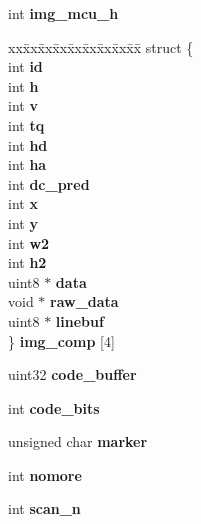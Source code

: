 \begin{DoxyCompactItemize}
\item 
\hypertarget{structjpeg_a6e013436253bcf1e5808a1774b96cc38}{}int {\bfseries img\+\_\+mcu\+\_\+h}\label{structjpeg_a6e013436253bcf1e5808a1774b96cc38}

\item 
\hypertarget{structjpeg_a1c4874d5cf0e2b80dc0d0b47ddd8be7a}{}\begin{tabbing}
xx\=xx\=xx\=xx\=xx\=xx\=xx\=xx\=xx\=\kill
struct \{\\
\>int {\bfseries id}\\
\>int {\bfseries h}\\
\>int {\bfseries v}\\
\>int {\bfseries tq}\\
\>int {\bfseries hd}\\
\>int {\bfseries ha}\\
\>int {\bfseries dc\_pred}\\
\>int {\bfseries x}\\
\>int {\bfseries y}\\
\>int {\bfseries w2}\\
\>int {\bfseries h2}\\
\>uint8 $\ast$ {\bfseries data}\\
\>void $\ast$ {\bfseries raw\_data}\\
\>uint8 $\ast$ {\bfseries linebuf}\\
\} {\bfseries img\_comp} \mbox{[}4\mbox{]}\label{structjpeg_a1c4874d5cf0e2b80dc0d0b47ddd8be7a}
\\

\end{tabbing}\item 
\hypertarget{structjpeg_abfc7f6a333ba3517e669e3e58113bbca}{}uint32 {\bfseries code\+\_\+buffer}\label{structjpeg_abfc7f6a333ba3517e669e3e58113bbca}

\item 
\hypertarget{structjpeg_a6d1b20b5d9d253006fde4e4dd8ab8c04}{}int {\bfseries code\+\_\+bits}\label{structjpeg_a6d1b20b5d9d253006fde4e4dd8ab8c04}

\item 
\hypertarget{structjpeg_a9a5cd40790fd432795fb19477c921f8c}{}unsigned char {\bfseries marker}\label{structjpeg_a9a5cd40790fd432795fb19477c921f8c}

\item 
\hypertarget{structjpeg_a2d114f4d52f50d8d85f43b2a3f161cec}{}int {\bfseries nomore}\label{structjpeg_a2d114f4d52f50d8d85f43b2a3f161cec}

\item 
\hypertarget{structjpeg_adca2f04da72e50086c77c7070731a679}{}int {\bfseries scan\+\_\+n}\label{structjpeg_adca2f04da72e50086c77c7070731a679}


\end{DoxyCompactItemize}
